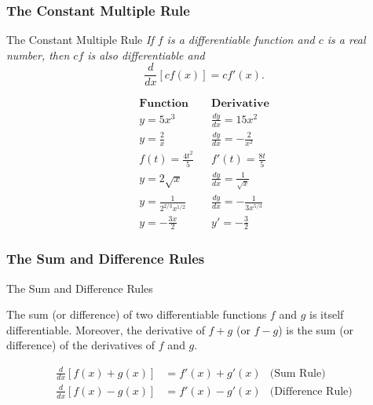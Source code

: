 \documentclass[12pt]{article}
\theoremstyle{beautifulthm}
\begin{document}
\subsubsection{The Constant Multiple Rule}
\begin{mytheorem}{The Constant Multiple Rule}{}
\textit{If \( f \) is a differentiable function and \( c \) is a real number, then \( cf \) is also differentiable and}
\[
\frac{d}{dx}[cf(x)] = c f'(x).
\]
\end{mytheorem}

\begin{tcolorbox}[colback=examplebg, colframe=red!75!black, title=\textbf{EXAMPLE 3: Using the Constant Multiple Rule}, fonttitle=\bfseries, sharp corners]
\begin{align*}
\textbf{Function} && \textbf{Derivative} \\
y = 5x^3 && \frac{dy}{dx} = 15x^2 \\
y = \frac{2}{x} && \frac{dy}{dx} = -\frac{2}{x^2} \\
f(t) = \frac{4t^2}{5} && f'(t) = \frac{8t}{5} \\
y = 2\sqrt{x} && \frac{dy}{dx} = \frac{1}{\sqrt{x}} \\
y = \frac{1}{2^{2/3}x^{1/2}} && \frac{dy}{dx} = -\frac{1}{3x^{5/3}} \\
y = -\frac{3x}{2} && y' = -\frac{3}{2}
\end{align*}

\end{tcolorbox}

\subsubsection{The Sum and Difference Rules}
\begin{mytheorem}{The Sum and Difference Rules}{}

The sum (or difference) of two differentiable functions \(f\) and \(g\) is itself differentiable. Moreover, the derivative of \(f + g\) (or \(f - g\)) is the sum (or difference) of the derivatives of \(f\) and \(g\).

\begin{align*}
\frac{d}{dx}[f(x) + g(x)] &= f'(x) + g'(x) & \text{(Sum Rule)} \\
\frac{d}{dx}[f(x) - g(x)] &= f'(x) - g'(x) & \text{(Difference Rule)}
\end{align*}
\end{mytheorem}
\end{document}
